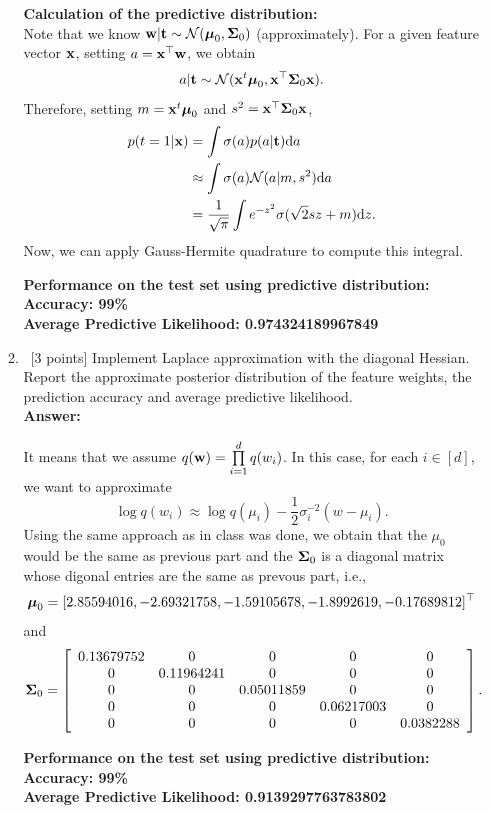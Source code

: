 \documentclass[12pt, fullpage,letterpaper]{article}
\def\red{\color{black!30!red}}
\def\blackblue{\color{black!40!blue}}
\begin{document}
\begin{enumerate}
\begin{enumerate}
{{\bf Calculation of the predictive distribution:}\\
Note that we know ${\bf w}|{\bf t} \sim \mathcal{N}(\boldsymbol{\mu}_0,\boldsymbol{\Sigma}_0)$ (approximately). 
For a given feature vector ${\bf x}$, setting $a = {\bf x}^\top {\bf w}$, we obtain 
$$a|{\bf t} \sim \mathcal{N}({\bf x}^t\boldsymbol{\mu}_0, {\bf x}^\top\boldsymbol{\Sigma}_0 {\bf x}).$$
Therefore, setting $m = {\bf x}^t\boldsymbol{\mu}_0$ and $s^2 = {\bf x}^\top\boldsymbol{\Sigma}_0 {\bf x}$, 
\begin{align*}
p(t=1|{\bf x}) &=  \int \sigma(a)p(a|{\bf t}){\rm d} a\\
& \approx \int \sigma(a)\mathcal{N}(a|m, s^2){\rm d} a\\
& =  \frac{1}{\sqrt{\pi}}\int e^{-z^2}\sigma(\sqrt{2}s z+m){\rm d} z.
\end{align*}
Now, we can apply Gauss-Hermite quadrature to compute this integral. 

\bigskip

{\bf Performance on the test set using predictive distribution:}\\
{\bf Accuracy: 99\%\\
Average Predictive Likelihood: 0.974324189967849}



}
		\item~[3 points] Implement Laplace approximation with the diagonal Hessian. Report the approximate posterior distribution of the feature weights, the prediction accuracy and average predictive likelihood. \\
{\bf \red Answer: }{\blackblue 
It means that we assume $q({\bf w}) = \prod\limits_{i=1}^d q(w_i)$.
In this case, for each $i\in[d]$, we want to approximate  
$$\log q(w_i)\approx  \log q(\mu_i) - \frac{1}{2}\sigma_i^{-2}(w-\mu_i).$$
Using the same approach as in class was done, we obtain 
that the $\mu_0$ would be the same as previous part and the $\boldsymbol{\Sigma}_0$ is a diagonal matrix whose digonal entries are the same as prevous part, i.e., $$\boldsymbol{\mu}_0 = [ 2.85594016, -2.69321758, -1.59105678, -1.8992619 , -0.17689812]^\top$$
and
$$\boldsymbol{\Sigma}_0 = \left[\begin{array}{ccccc}
0.13679752 & 0 & 0 & 0 &  0\\
0 &  0.11964241 &  0 &  0 &  0\\
0 &  0 & 0.05011859 &  0 &  0\\
0 &  0 &  0 &  0.06217003 &  0\\
0 &  0 &  0 &  0  &  0.0382288
\end{array}\right].$$


{\bf Performance on the test set using predictive distribution:}\\
{\bf Accuracy: 99\%\\
Average Predictive Likelihood: 0.9139297763783802}

}
\end{enumerate}
\end{enumerate}
\end{document}
